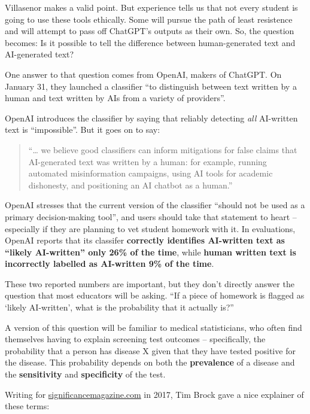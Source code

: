 \documentclass[
  letterpaper,
  DIV=11,
  numbers=noendperiod,
  oneside]{scrartcl}
\begin{document}
Villasenor makes a valid point. But experience tells us that not every
student is going to use these tools ethically. Some will pursue the path
of least resistence and will attempt to pass off ChatGPT's outputs as
their own. So, the question becomes: Is it possible to tell the
difference between human-generated text and AI-generated text?

One answer to that question comes from OpenAI, makers of ChatGPT. On
January 31, they launched a classifier ``to distinguish between text
written by a human and text written by AIs from a variety of
providers''.

OpenAI introduces the classifier by saying that reliably detecting
\emph{all} AI-written text is ``impossible''. But it goes on to say:

\begin{quote}
``\ldots{} we believe good classifiers can inform mitigations for false
claims that AI-generated text was written by a human: for example,
running automated misinformation campaigns, using AI tools for academic
dishonesty, and positioning an AI chatbot as a human.''
\end{quote}

OpenAI stresses that the current version of the classifier ``should not
be used as a primary decision-making tool'', and users should take that
statement to heart -- especially if they are planning to vet student
homework with it. In evaluations, OpenAI reports that its classifer
\textbf{correctly identifies AI-written text as ``likely AI-written''
only 26\% of the time}, while \textbf{human written text is incorrectly
labelled as AI-written 9\% of the time}.

These two reported numbers are important, but they don't directly answer
the question that most educators will be asking. ``If a piece of
homework is flagged as `likely AI-written', what is the probability that
it actually is?''

A version of this question will be familiar to medical statisticians,
who often find themselves having to explain screening test outcomes --
specifically, the probability that a person has disease X given that
they have tested positive for the disease. This probability depends on
both the \textbf{prevalence} of a disease and the \textbf{sensitivity}
and \textbf{specificity} of the test.

Writing for
\href{https://www.significancemagazine.com/science/547-a-visual-guide-to-screening-test-results?highlight=WyJzY3JlZW5pbmciXQ==}{significancemagazine.com}
in 2017, Tim Brock gave a nice explainer of these terms:
\end{document}
